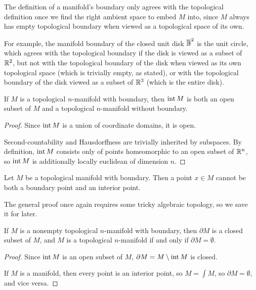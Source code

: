 The definition of a manifold's boundary only agrees with the topological definition once we find the right ambient space to embed $M$ into, since $M$ always has empty topological boundary when viewed as a topological space of its own.

For example, the manifold boundary of the closed unit disk $\overline{{\mathbb{B}}}^2$ is the unit circle, which agrees with the topological boundary if the disk is viewed as a subset of $\mathbb{R}^2$, but not with the topological boundary of the disk when viewed as its own topological space (which is trivially empty, as stated), or with the topological boundary of the disk viewed as a subset of $\mathbb{R}^3$ (which is the entire disk).
\begin{theorem}
	If $M$ is a topological $n$-manifold with boundary, then $\operatorname{int} M$ is both an open subset of $M$ and a topological $n$-manifold without boundary.
\end{theorem}
\begin{proof}
	Since $\operatorname{int} M$ is a union of coordinate domains, it is open.
	
	Second-countability and Hausdorffness are trivially inherited by subspaces. By definition, $\operatorname{int} M$ consists only of points homeomorphic to an open subset of $\mathbb{R}^n$, so $\operatorname{int} M$ is additionally locally euclidean of dimension $n$.
\end{proof}
\begin{proposition}
	Let $M$ be a topological manifold with boundary. Then a point $x \in M$ cannot be both a boundary point and an interior point.
\end{proposition}
The general proof once again requires some tricky algebraic topology, so we save it for later.
\begin{corollary}
	If $M$ is a nonempty topological $n$-manifold with boundary, then $\partial M$ is a closed subset of $M$, and $M$ is a topological $n$-manifold if and only if $\partial M = \emptyset$.
\end{corollary}
\begin{proof}
	Since $\operatorname{int} M$ is an open subset of $M$, $\partial M = M \setminus \operatorname{int} M$ is closed.
	
	If $M$ is a manifold, then every point is an interior point, so $M = \int M$, so $\partial M = \emptyset$, and vice versa.
\end{proof}

\clearpage

